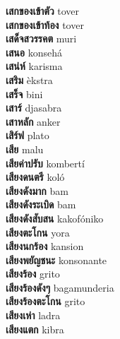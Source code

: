 \textbf{ เสกของเข้าตัว  } tover \\
\textbf{ เสกของเข้าท้อง  } tover \\
\textbf{ เสด็จสวรรคต  } muri \\
\textbf{ เสนอ  } konsehá \\
\textbf{ เสน่ห์  } karisma \\
\textbf{ เสริม  } èkstra \\
\textbf{ เสร็จ  } bini \\
\textbf{ เสาร์  } djasabra \\
\textbf{ เสาหลัก  } anker \\
\textbf{ เสิร์ฟ  } plato \\
\textbf{ เสีย  } malu \\
\textbf{ เสียค่าปรับ  } kombertí \\
\textbf{ เสียงดนตรี  } koló \\
\textbf{ เสียงดังมาก  } bam \\
\textbf{ เสียงดังระเบิด  } bam \\
\textbf{ เสียงดังสับสน  } kakofóniko \\
\textbf{ เสียงตะโกน  } yora \\
\textbf{ เสียงนกร้อง  } kansion \\
\textbf{ เสียงพยัญชนะ  } konsonante \\
\textbf{ เสียงร้อง  } grito \\
\textbf{ เสียงร้องดังๆ  } bagamunderia \\
\textbf{ เสียงร้องตะโกน  } grito \\
\textbf{ เสียงเห่า  } ladra \\
\textbf{ เสียงแตก  } kibra \\
